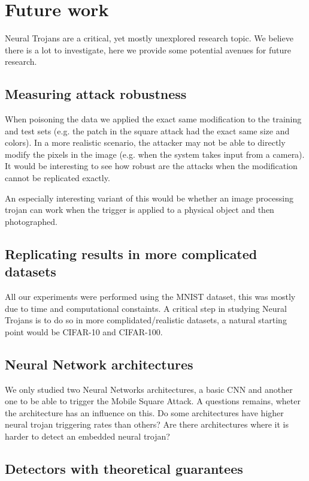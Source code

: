 \documentclass[letterpaper, 10 pt, conference]{ieeeconf}  %
\begin{document}
\section{Future work}

Neural Trojans are a critical, yet mostly unexplored research topic. We believe
there is a lot to investigate, here we provide some potential avenues for
future research.

\subsection{Measuring attack robustness}

When poisoning the data we applied the exact same modification to the training
and test sets (e.g. the patch in the square attack had the exact same size and
colors). In a more realistic scenario, the attacker may not be able to directly
modify the pixels in the image (e.g. when the system takes input from a
camera). It would be interesting to see how robust are the attacks when the
modification cannot be replicated exactly.

An especially interesting variant of this would be whether an image
processing trojan can work when the trigger is applied to a physical
object and then photographed.

\subsection{Replicating results in more complicated datasets}

All our experiments were performed using the MNIST dataset, this was mostly due
to time and computational constaints. A critical step in studying Neural
Trojans is to do so in more complidated/realistic datasets, a natural starting
point would be CIFAR-10 and CIFAR-100.

\subsection{Neural Network architectures}

We only studied two Neural Networks architectures, a basic CNN and another one
to be able to trigger the Mobile Square Attack. A questions remains, wheter
the architecture has an influence on this. Do some architectures have higher
neural trojan triggering rates than others? Are there architectures where it
is harder to detect an embedded neural trojan?


\subsection{Detectors with theoretical guarantees}
\end{document}
